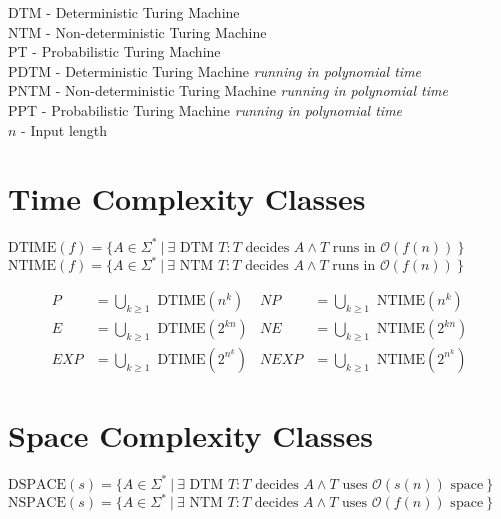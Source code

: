 \documentclass[
    13pt,
    oneside,
    a4paper,
    numbers=enddot,
    abstractoff,
    parskip=full
]{scrreprt}
\begin{document}



DTM - Deterministic Turing Machine\\
NTM - Non-deterministic Turing Machine\\
PT - Probabilistic Turing Machine\\
PDTM - Deterministic Turing Machine \textit{running in polynomial time}\\
PNTM - Non-deterministic Turing Machine \textit{running in polynomial time}\\
PPT - Probabilistic Turing Machine \textit{running in polynomial time}\\
$n$ - Input length




\section*{Time Complexity Classes}
\label{sec:time_complexity_classes}

$\text{DTIME}(f) = \{
    A \in \Sigma^\ast ~|~
    \exists \text{ DTM } T:
    T \text{ decides } A \land
    T \text{ runs in } \mathcal{O}(f(n))
~\}$
$\text{NTIME}(f) = \{
    A \in \Sigma^\ast ~|~
    \exists \text{ NTM } T:
    T \text{ decides } A \land
    T \text{ runs in } \mathcal{O}(f(n))
~\}$


\begin{align*}
        P       &= \bigcup_{k \geq 1} \text{ DTIME}(n^k)
    &   NP      &= \bigcup_{k \geq 1} \text{ NTIME}(n^k)
    \\
        E       &= \bigcup_{k \geq 1} \text{ DTIME}(2^{kn})
    &   NE      &= \bigcup_{k \geq 1} \text{ NTIME}(2^{kn})
    \\
        EXP     &= \bigcup_{k \geq 1} \text{ DTIME}(2^{n^k})
    &   NEXP    &= \bigcup_{k \geq 1} \text{ NTIME}(2^{n^k})
\end{align*}






\section*{Space Complexity Classes}
\label{sec:space_complexity_classes}


$\text{DSPACE}(s) = \{
    A \in \Sigma^\ast ~|~
    \exists \text{ DTM } T:
    T \text{ decides } A \land
    T \text{ uses } \mathcal{O}(s(n)) \text{ space}
~\}$
$\text{NSPACE}(s) = \{
    A \in \Sigma^\ast ~|~
    \exists \text{ NTM } T:
    T \text{ decides } A \land
    T \text{ uses } \mathcal{O}(f(n)) \text{ space}
~\}$
\end{document}
